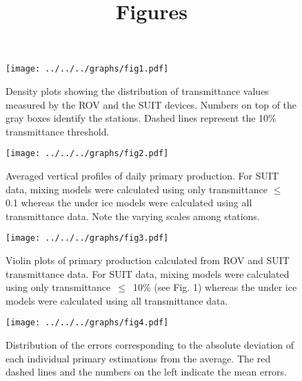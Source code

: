 \documentclass[12pt,a4paper]{scrartcl}
\title{Figures}
\date{}
\begin{document}
\maketitle

\begin{figure}[h]
	\centering
	\texttt{[image: ../../../graphs/fig1.pdf]}
	\caption{Density plots showing the distribution of transmittance values measured by the ROV and the SUIT devices. Numbers on top of the gray boxes identify the stations. Dashed lines represent the 10\% transmittance threshold.}
\end{figure}

\clearpage
\newpage

\begin{figure}[h]
	\centering
	\texttt{[image: ../../../graphs/fig2.pdf]}
	\caption{Averaged vertical profiles of daily primary production. For SUIT data, mixing models were calculated using only transmittance $\le$ 0.1 whereas the under ice models were calculated using all transmittance data. Note the varying scales among stations.}
\end{figure}

\clearpage
\newpage

\begin{figure}[h]
	\centering
	\texttt{[image: ../../../graphs/fig3.pdf]}
	\caption{Violin plots of primary production calculated from ROV and SUIT transmittance data. For SUIT data, mixing models were calculated using only transmittance~$\le$~10\% (see Fig. 1) whereas the under ice models were calculated using all transmittance data.}
\end{figure}

\clearpage
\newpage

\begin{figure}[h]
	\centering
	\texttt{[image: ../../../graphs/fig4.pdf]}
	\caption{Distribution of the errors corresponding to the absolute deviation of each individual primary estimations from the average. The red dashed lines and the numbers on the left indicate the mean errors.}
\end{figure}
\end{document}
